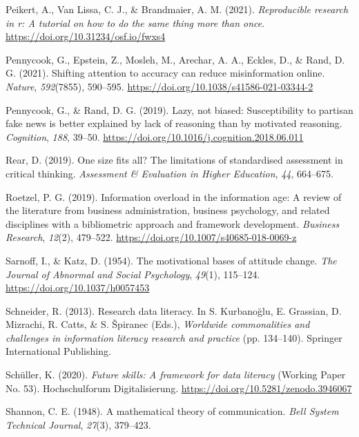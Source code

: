 \documentclass[
  12pt,
  a4paper,
  twoside]{article}
\newlength{\cslhangindent}
\newenvironment{CSLReferences}[2] %
 {\begin{list}{}{%
  \setlength{\itemindent}{0pt}
  \setlength{\leftmargin}{0pt}
  \setlength{\parsep}{0pt}
  \ifodd #1
   \setlength{\leftmargin}{\cslhangindent}
   \setlength{\itemindent}{-1\cslhangindent}
  \fi
  \setlength{\itemsep}{#2\baselineskip}}}
 {\end{list}}
\begin{document}
\begin{CSLReferences}{1}{0}
Peikert, A., Van Lissa, C. J., \& Brandmaier, A. M. (2021). \emph{Reproducible research in r: A tutorial on how to do the same thing more than once}. \url{https://doi.org/10.31234/osf.io/fwxs4}

Pennycook, G., Epstein, Z., Mosleh, M., Arechar, A. A., Eckles, D., \& Rand, D. G. (2021). Shifting attention to accuracy can reduce misinformation online. \emph{Nature}, \emph{592}(7855), 590--595. \url{https://doi.org/10.1038/s41586-021-03344-2}

Pennycook, G., \& Rand, D. G. (2019). Lazy, not biased: Susceptibility to partisan fake news is better explained by lack of reasoning than by motivated reasoning. \emph{Cognition}, \emph{188}, 39--50. \url{https://doi.org/10.1016/j.cognition.2018.06.011}

Rear, D. (2019). One size fits all? The limitations of standardised assessment in critical thinking. \emph{Assessment \& Evaluation in Higher Education}, \emph{44}, 664--675.

Roetzel, P. G. (2019). Information overload in the information age: A review of the literature from business administration, business psychology, and related disciplines with a bibliometric approach and framework development. \emph{Business Research}, \emph{12}(2), 479--522. \url{https://doi.org/10.1007/s40685-018-0069-z}

Sarnoff, I., \& Katz, D. (1954). The motivational bases of attitude change. \emph{The Journal of Abnormal and Social Psychology}, \emph{49}(1), 115--124. \url{https://doi.org/10.1037/h0057453}

Schneider, R. (2013). Research data literacy. In S. Kurbanoğlu, E. Grassian, D. Mizrachi, R. Catts, \& S. Špiranec (Eds.), \emph{Worldwide commonalities and challenges in information literacy research and practice} (pp. 134--140). Springer International Publishing.

Schüller, K. (2020). \emph{Future skills: A framework for data literacy} (Working Paper No. 53). Hochschulforum Digitalisierung. \url{https://doi.org/10.5281/zenodo.3946067}

Shannon, C. E. (1948). A mathematical theory of communication. \emph{Bell System Technical Journal}, \emph{27}(3), 379--423.


\end{CSLReferences}
\end{document}
